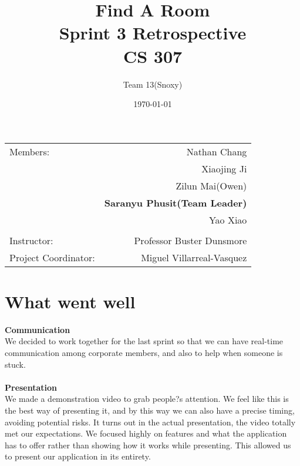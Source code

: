 \documentclass[12pt]{article}
\title{\textbf{Find A Room} \\ Sprint 3 Retrospective \\ CS 307} %
\author{Team \textsc{13}(Snoxy)} %
\date{\today} %
\begin{document}
\maketitle %

\begin{center}
\begin{tabular}{l r}
Members: & Nathan Chang \\ %
& Xiaojing Ji \\
& Zilun Mai(Owen) \\
& \textbf{Saranyu Phusit(Team Leader)} \\
& Yao Xiao \\
\\
\bigskip
Instructor: & Professor Buster Dunsmore \\%
Project Coordinator: & Miguel Villarreal-Vasquez %

\end{tabular}
\end{center}

\newpage




\newpage
\section{What went well}

\textbf{Communication}\\ We decided to work together for the last sprint so that we can have real-time communication among corporate members, and also to help when someone is stuck. \\ \\

\textbf{Presentation}\\ We made a demonstration video to grab people?s attention. We feel like this is the best way of presenting it, and by this way we can also have a precise timing, avoiding potential risks. It turns out in the actual presentation, the video totally met our expectations. We focused highly on features and what the application has to offer rather than showing how it works while presenting. This allowed us to present our application in its entirety.  \\ \\
\end{document}
